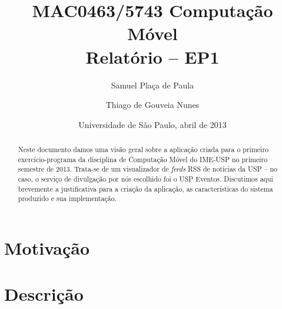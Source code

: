 \documentclass[brazil]{article}
\begin{document}
\title{MAC0463/5743 Computação Móvel\\\medskip
    Relatório -- EP1}
\author{Samuel Plaça de Paula
        \and Thiago de Gouveia Nunes}
\date{Universidade de São Paulo, abril de 2013}

\maketitle
\pagestyle{plain}
\footskip=25pt


\begin{abstract}
    Neste documento damos uma visão geral sobre a aplicação criada para o
    primeiro exercício-programa da disciplina de Computação Móvel do IME-USP
    no primeiro semestre de 2013\footnotemark[1].
    Trata-se de um visualizador de \emph{feeds}
    RSS de notícias da USP -- no caso, o serviço de divulgação por nós
    escolhido foi o USP Eventos\footnotemark[2].
    Discutimos aqui brevemente a justificativa para a criação da aplicação,
    as características do sistema produzido e sua implementação.
\end{abstract}




\section{Motivação}


\section{Descrição}
\end{document}
